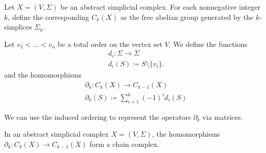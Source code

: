 \begin{definition}\label{def:group_of_chains}\cite[262]{Carlsson2009}
  Let $X = (V, \Sigma)$ be an abstract simplicial complex. For each nonnegative integer $k$, define the corresponding  $C_k(X)$ as the free abelian group generated by the $k$-simplices $\Sigma_k$.

  Let $v_1 < \ldots < v_n$ be a total order on the vertex set $V$. We define the functions
  \begin{align*}
    &d_i: \Sigma \to \Sigma \\
    &d_i(S) \coloneqq S \setminus \{ v_i \}.
  \end{align*}
  and the homomorphisms
  \begin{align*}
    &\partial_k: C_k(X) \to C_{k-1}(X) \\
    &\partial_k(S) \coloneqq \sum_{i=1}^k (-1)^i d_i(S)
  \end{align*}

  We can use the induced ordering to represent the operators $\partial_k$ via matrices.
\end{definition}

\begin{proposition}\label{def:abstract_simplicial_chain_complex}
  In an abstract simplicial complex $X = (V, \Sigma)$, the homomorphisms $\partial_k: C_k(X) \to C_{k-1}(X)$ form a chain complex.
\end{proposition}
